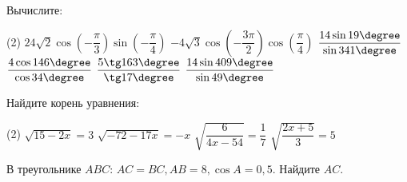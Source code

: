 \begin{homework}[number=1]
	\begin{listofex}
		\item Вычислите: %
		\begin{tasks}(2)
			\task \( 24 \sqrt{2} \cos \left( -\dfrac{ \pi }{ 3 } \right) \sin \left( -\dfrac{ \pi }{ 4 } \right)  \)
			\task \( -4 \sqrt{3} \cos \left( -\dfrac{ 3\pi }{ 2 } \right) \cos \left( \dfrac{ \pi}{4  } \right) \)
			\task \( \dfrac{ 14 \sin 19 \degree }{ \sin 341 \degree } \)
			\task \( \dfrac{ 4 \cos 146 \degree }{ \cos 34 \degree } \)
			\task \( \dfrac{ 5 \tg 163 \degree }{ \tg 17 \degree } \)
			\task \( \dfrac{14 \sin 409 \degree  }{ \sin 49 \degree } \)
		\end{tasks}
		\item Найдите корень уравнения:
		\begin{tasks}(2)
			\task \( \sqrt{15-2x}=3 \)
			\task \( \sqrt{-72-17x}=-x \)
			\task \( \sqrt{\dfrac{ 6 }{ 4x-54 }}=\dfrac{ 1 }{ 7 } \)
			\task \( \sqrt{\dfrac{ 2x+5 }{ 3 }}=5 \)
		\end{tasks}
		
		
		\item В треугольнике \(ABC\): \(AC=BC, AB=8, \cos A = 0,5\). Найдите \(AC\).
		
	\end{listofex}
\end{homework}

